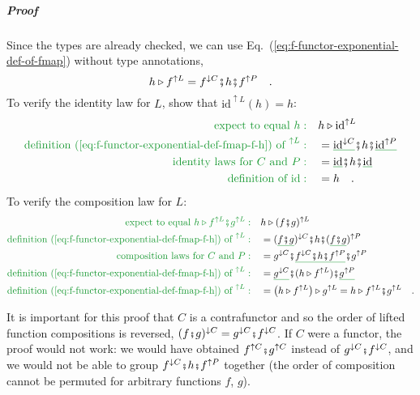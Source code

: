 \subparagraph{Proof}

Since the types are already checked, we can use Eq.~(\ref{eq:f-functor-exponential-def-of-fmap})
without type annotations,
\begin{equation}
h\triangleright f^{\uparrow L}=f^{\downarrow C}\bef h\bef f^{\uparrow P}\quad.\label{eq:f-functor-exponential-def-fmap-f-h}
\end{equation}
To verify the identity law for $L$, show that $\text{id}^{\uparrow L}(h)=h$:
\begin{align*}
{\color{greenunder}\text{expect to equal }h:}\quad & h\triangleright\text{id}^{\uparrow L}\\
{\color{greenunder}\text{definition (\ref{eq:f-functor-exponential-def-fmap-f-h}) of }^{\uparrow L}:}\quad & =\gunderline{\text{id}^{\downarrow C}}\bef h\bef\gunderline{\text{id}^{\uparrow P}}\\
{\color{greenunder}\text{identity laws for }C\text{ and }P:}\quad & =\gunderline{\text{id}}\bef h\bef\gunderline{\text{id}}\\
{\color{greenunder}\text{definition of }\text{id}:}\quad & =h\quad.
\end{align*}
To verify the composition law for $L$:
\begin{align*}
{\color{greenunder}\text{expect to equal }h\triangleright f^{\uparrow L}\bef g^{\uparrow L}:}\quad & h\triangleright(f\bef g)^{\uparrow L}\\
{\color{greenunder}\text{definition (\ref{eq:f-functor-exponential-def-fmap-f-h}) of }^{\uparrow L}:}\quad & =(\gunderline{f\bef g})^{\downarrow C}\bef h\bef(\gunderline{f\bef g})^{\uparrow P}\\
{\color{greenunder}\text{composition laws for }C\text{ and }P:}\quad & =g^{\downarrow C}\bef\gunderline{f^{\downarrow C}\bef h\bef f^{\uparrow P}}\bef g^{\uparrow P}\\
{\color{greenunder}\text{definition (\ref{eq:f-functor-exponential-def-fmap-f-h}) of }^{\uparrow L}:}\quad & =\gunderline{g^{\downarrow C}}\bef(h\triangleright f^{\uparrow L})\bef\gunderline{g^{\uparrow P}}\\
{\color{greenunder}\text{definition (\ref{eq:f-functor-exponential-def-fmap-f-h}) of }^{\uparrow L}:}\quad & =\left(h\triangleright f^{\uparrow L}\right)\triangleright g^{\uparrow L}=h\triangleright f^{\uparrow L}\bef g^{\uparrow L}\quad.
\end{align*}

It is important for this proof that $C$ is a contrafunctor and so
the order of lifted function compositions is reversed, $(f\bef g)^{\downarrow C}=g^{\downarrow C}\bef f^{\downarrow C}$.
If $C$ were a functor, the proof would not work: we would have obtained
$f^{\uparrow C}\bef g^{\uparrow C}$ instead of $g^{\downarrow C}\bef f^{\downarrow C}$,
and we would not be able to group $f^{\downarrow C}\bef h\bef f^{\uparrow P}$
together (the order of composition cannot be permuted for arbitrary
functions $f$, $g$).

